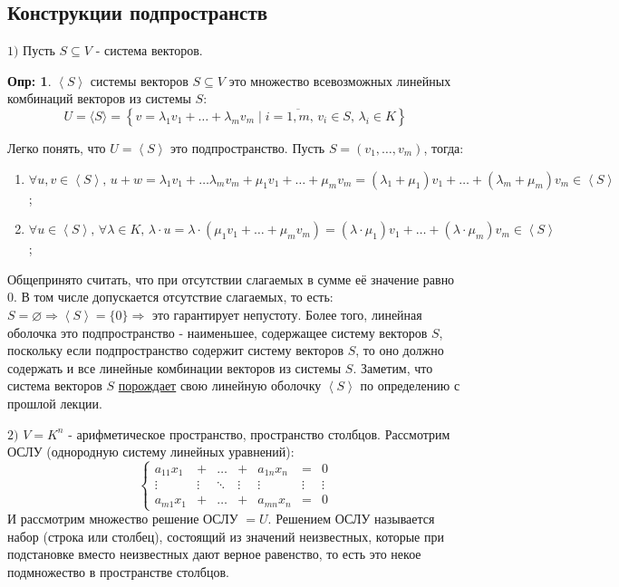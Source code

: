 \documentclass[12pt]{article}
\newcommand{\VN}{\varnothing}
\theoremstyle{definition}
\newtheorem{defn}{Опр:}
\newcommand{\linsp}[1]{\left\langle #1 \right\rangle }
\begin{document}
\subsection*{Конструкции подпространств}
$1)$ Пусть $S \subseteq V$ - система векторов.
\begin{defn}
	 $\linsp{S}$ системы векторов $S \subseteq V$ это множество всевозможных линейных комбинаций векторов из системы $S$:
	$$
		U = \langle S \rangle = \left\{v = \lambda_1 v_1 + \dotsc+ \lambda_m v_m \mid i = \overline{1,m}, \, v_i \in S, \, \lambda_i \in K\right\}
	$$ 
\end{defn}
Легко понять, что $U = \linsp{S}$ это подпространство. Пусть $S = (v_1, \dotsc, v_m)$, тогда: 
\begin{enumerate}[label=\arabic*)]
	\item $\forall u,v \in \linsp{S}, \, u + w = \lambda_1 v_1 + \dotsc \lambda_m v_m + \mu_1 v_1 + \dotsc + \mu_m v_m = (\lambda_1 + \mu_1)v_1 + \dotsc + (\lambda_m + \mu_m)v_m \in \linsp{S}$;
	\item $\forall u \in \linsp{S}, \, \forall \lambda \in K, \, \lambda{\cdot}u = \lambda {\cdot}( \mu_1v_1 + \dotsc + \mu_m v_m) = (\lambda{\cdot}\mu_1)v_1 + \dotsc + (\lambda{\cdot}\mu_m)v_m \in \linsp{S}$;
\end{enumerate}

Общепринято считать, что при отсутствии слагаемых в сумме её значение равно $0$. В том числе допускается отсутствие слагаемых, то есть: $S = \VN \Rightarrow \linsp{S} = \{0\} \Rightarrow$ это гарантирует непустоту. Более того, линейная оболочка это подпространство - наименьшее, содержащее систему векторов $S$, поскольку если подпространство содержит систему векторов $S$, то оно должно содержать и все линейные комбинации векторов из системы $S$. Заметим, что система векторов $S$ \uline{порождает} свою линейную оболочку $\linsp{S}$ по определению с прошлой лекции.

\newpage
$2)$ $V = K^n$ - арифметическое пространство, пространство столбцов. Рассмотрим ОСЛУ (однородную систему линейных уравнений):
$$
	\left\{
	\begin{array}{ccccccc}
		a_{11}x_1 & + & \dotsc & + & a_{1n}x_n & = & 0 \\
		\vdots & \vdots & \ddots & \vdots & \vdots & \vdots & \vdots \\
		a_{m1}x_1 & + & \dotsc & + & a_{mn}x_n & = & 0 
	\end{array}
	\right.
$$
И рассмотрим множество решение ОСЛУ $= U$. Решением ОСЛУ называется набор (строка или столбец), состоящий из значений неизвестных, которые при подстановке вместо неизвестных дают верное равенство, то есть это некое подмножество в пространстве столбцов. 
\end{document}
